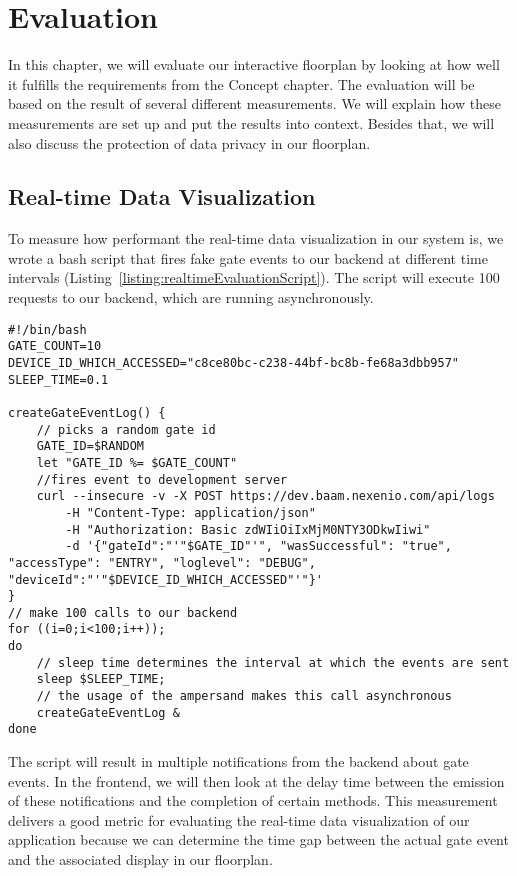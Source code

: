 \section{Evaluation}

In this chapter, we will evaluate our interactive floorplan by looking at how well it fulfills the requirements from the Concept chapter. The evaluation will be based on the result of several different measurements. We will explain how these measurements are set up and put the results into context. Besides that, we will also discuss the protection of data privacy in our floorplan.

\subsection{Real-time Data Visualization}

To measure how performant the real-time data visualization in our system is, we wrote a bash script that fires fake gate events to our backend at different time intervals (Listing~\ref{listing:realtimeEvaluationScript}). The script will execute 100 requests to our backend, which are running asynchronously.

\begin{lstlisting}[label={listing:realtimeEvaluationScript},caption={Bash script for creating fake gate events at intervals}]
#!/bin/bash
GATE_COUNT=10
DEVICE_ID_WHICH_ACCESSED="c8ce80bc-c238-44bf-bc8b-fe68a3dbb957"
SLEEP_TIME=0.1

createGateEventLog() {
    // picks a random gate id 
    GATE_ID=$RANDOM
    let "GATE_ID %= $GATE_COUNT"
    //fires event to development server
    curl --insecure -v -X POST https://dev.baam.nexenio.com/api/logs 
        -H "Content-Type: application/json" 
        -H "Authorization: Basic zdWIiOiIxMjM0NTY3ODkwIiwi" 
        -d '{"gateId":"'"$GATE_ID"'", "wasSuccessful": "true", "accessType": "ENTRY", "loglevel": "DEBUG", "deviceId":"'"$DEVICE_ID_WHICH_ACCESSED"'"}'
}
// make 100 calls to our backend
for ((i=0;i<100;i++));
do
    // sleep time determines the interval at which the events are sent
    sleep $SLEEP_TIME;
    // the usage of the ampersand makes this call asynchronous
    createGateEventLog &
done
\end{lstlisting}

The script will result in multiple notifications from the backend about gate events. In the frontend, we will then look at the delay time between the emission of these notifications and the completion of certain methods. This measurement delivers a good metric for evaluating the real-time data visualization of our application because we can determine the time gap between the actual gate event and the associated display in our floorplan.

